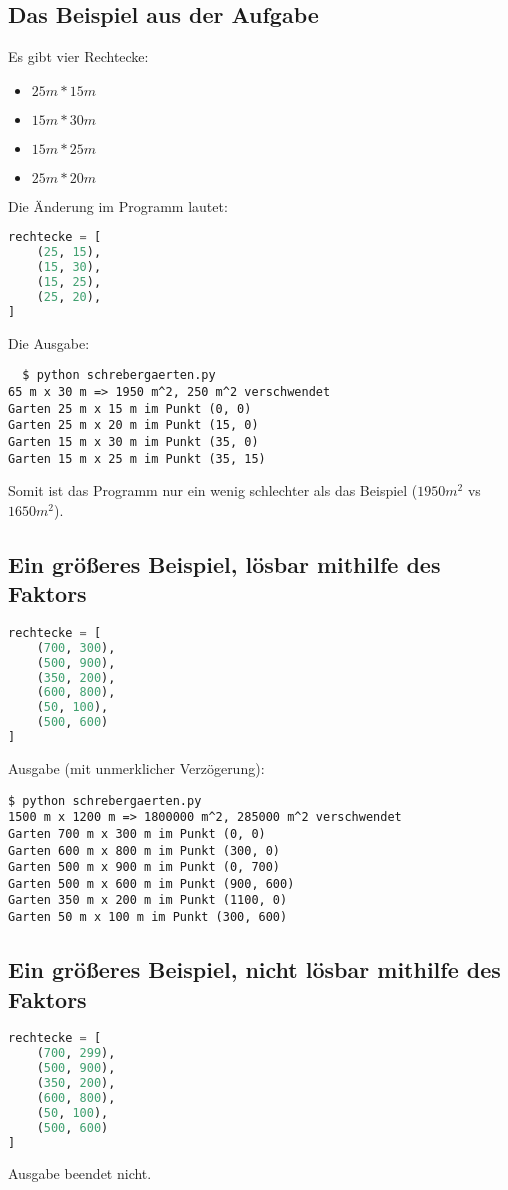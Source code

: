 \documentclass[a4paper,10pt,ngerman]{scrartcl}
\begin{document}
\subsection{Das Beispiel aus der Aufgabe}
Es gibt vier Rechtecke: 
\begin{itemize}
  \item $25m*15m$
  \item $15m*30m$
  \item $15m*25m$
  \item $25m*20m$
\end{itemize}
Die Änderung im Programm lautet:
\begin{lstlisting}[language=Python]
rechtecke = [
    (25, 15),
    (15, 30),
    (15, 25),
    (25, 20),
]
\end{lstlisting}
Die Ausgabe:
\begin{lstlisting}
  $ python schrebergaerten.py
65 m x 30 m => 1950 m^2, 250 m^2 verschwendet
Garten 25 m x 15 m im Punkt (0, 0)
Garten 25 m x 20 m im Punkt (15, 0)
Garten 15 m x 30 m im Punkt (35, 0)
Garten 15 m x 25 m im Punkt (35, 15)
\end{lstlisting}

Somit ist das Programm nur ein wenig schlechter als das Beispiel ($1950m^2$ vs $1650m^2$).


\subsection{Ein größeres Beispiel, lösbar mithilfe des Faktors}
\label{faktor-loesbar}

\begin{lstlisting}[language=Python]
rechtecke = [
    (700, 300),
    (500, 900),
    (350, 200),
    (600, 800),
    (50, 100),
    (500, 600)
]
\end{lstlisting}
Ausgabe (mit unmerklicher Verzögerung):
\begin{lstlisting}
$ python schrebergaerten.py
1500 m x 1200 m => 1800000 m^2, 285000 m^2 verschwendet
Garten 700 m x 300 m im Punkt (0, 0)
Garten 600 m x 800 m im Punkt (300, 0)
Garten 500 m x 900 m im Punkt (0, 700)
Garten 500 m x 600 m im Punkt (900, 600)
Garten 350 m x 200 m im Punkt (1100, 0)
Garten 50 m x 100 m im Punkt (300, 600)
\end{lstlisting}

\subsection{Ein größeres Beispiel, nicht lösbar mithilfe des Faktors}
\label{faktor-nicht-loesbar}
\begin{lstlisting}[language=Python]
rechtecke = [
    (700, 299),
    (500, 900),
    (350, 200),
    (600, 800),
    (50, 100),
    (500, 600)
]
\end{lstlisting}
Ausgabe beendet nicht.
\end{document}
